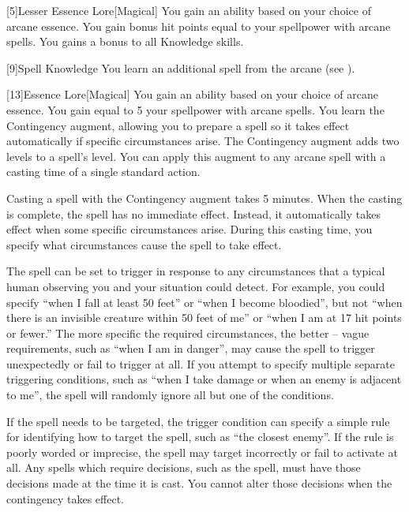             [5]{Lesser Essence Lore}[Magical]
            You gain an ability based on your choice of arcane essence.
             You gain bonus hit points equal to your spellpower with arcane spells.
             You gains a  bonus to all Knowledge skills.

            [9]{Spell Knowledge}
            You learn an additional spell from the arcane  (see ).

            [13]{Essence Lore}[Magical]
            You gain an ability based on your choice of arcane essence.
             You gain  equal to 5 \add your spellpower with arcane spells.
             You learn the Contingency augment, allowing you to prepare a spell so it takes effect automatically if specific circumstances arise.
            The Contingency augment adds two levels to a spell's level.
            You can apply this augment to any arcane spell with a casting time of a single standard action.

            Casting a spell with the Contingency augment takes 5 minutes.
            When the casting is complete, the spell has no immediate effect.
            Instead, it automatically takes effect when some specific circumstances arise.
            During this casting time, you specify what circumstances cause the spell to take effect.

            The spell can be set to trigger in response to any circumstances that a typical human observing you and your situation could detect.
            For example, you could specify ``when I fall at least 50 feet'' or ``when I become bloodied'', but not ``when there is an invisible creature within 50 feet of me'' or ``when I am at 17 hit points or fewer.''
            The more specific the required circumstances, the better -- vague requirements, such as ``when I am in danger'', may cause the spell to trigger unexpectedly or fail to trigger at all.
            If you attempt to specify multiple separate triggering conditions, such as ``when I take damage or when an enemy is adjacent to me'', the spell will randomly ignore all but one of the conditions.

            If the spell needs to be targeted, the trigger condition can specify a simple rule for identifying how to target the spell, such as ``the closest enemy''.
            If the rule is poorly worded or imprecise, the spell may target incorrectly or fail to activate at all.
            Any spells which require decisions, such as the  spell, must have those decisions made at the time it is cast.
            You cannot alter those decisions when the contingency takes effect.

